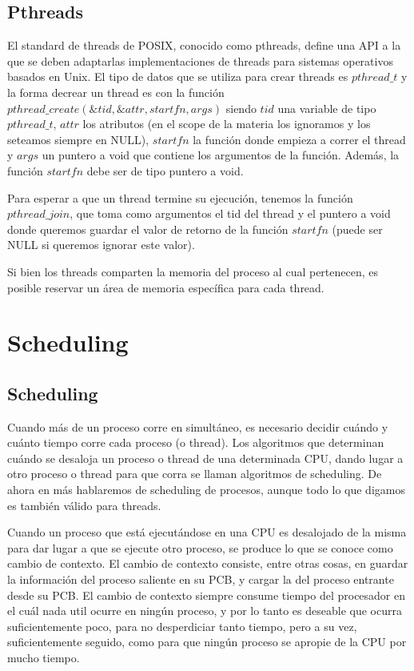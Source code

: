 \documentclass{article}
\begin{document}
\subsection{Pthreads}

El standard de threads de POSIX, conocido como pthreads, define una API a la que se deben adaptarlas implementaciones de threads para sistemas operativos basados en Unix. El tipo de datos que se utiliza para crear threads es $pthread\_t$ y la forma decrear un thread es con la funci\'on $pthread\_create(\&tid,\&attr,startfn,args)$ siendo $tid$ una variable de tipo $pthread\_t$, $attr$ los atributos (en el scope de la materia los ignoramos y los seteamos siempre en NULL), $startfn$ la funci\'on donde empieza a correr el thread y $args$ un puntero a void que contiene los argumentos de la funci\'on. Adem\'as, la funci\'on $startfn$ debe ser de tipo puntero a void.

Para esperar a que un thread termine su ejecuci\'on, tenemos la funci\'on $pthread\_join$, que toma como argumentos el tid del thread y el puntero a void donde queremos guardar el valor de retorno de la funci\'on $startfn$ (puede ser NULL si queremos ignorar este valor).

Si bien los threads comparten la memoria del proceso al cual pertenecen, es posible reservar un \'area de memoria espec\'ifica para cada thread.

\section{Scheduling}

\subsection{Scheduling}

Cuando m\'as de un proceso corre en simult\'aneo, es necesario decidir cu\'ando y cu\'anto tiempo corre cada proceso (o thread). Los algoritmos que determinan cu\'ando se desaloja un proceso o thread de una determinada CPU, dando lugar a otro proceso o thread para que corra se llaman algoritmos de scheduling. De ahora en m\'as hablaremos de scheduling de procesos, aunque todo lo que digamos es tambi\'en v\'alido para threads.

Cuando un proceso que est\'a ejecut\'andose en una CPU es desalojado de la misma para dar lugar a que se ejecute otro proceso, se produce lo que se conoce como cambio de contexto. El cambio de contexto consiste, entre otras cosas, en guardar la informaci\'on del proceso saliente en su PCB, y cargar la del proceso entrante desde su PCB. El cambio de contexto siempre consume tiempo del procesador en el cu\'al nada util ocurre en ning\'un proceso, y por lo tanto es deseable que ocurra suficientemente poco, para no desperdiciar tanto tiempo, pero a su vez, suficientemente seguido, como para que ning\'un proceso se apropie de la CPU por mucho tiempo.
\end{document}
